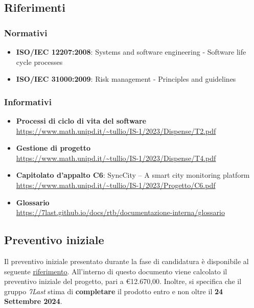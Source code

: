 \subsection{Riferimenti}
    \subsubsection{Normativi} %
        \begin{itemize}
            \item \textbf{ISO/IEC 12207:2008}: Systems and software engineering - Software life cycle processes
            \item \textbf{ISO/IEC 31000:2009}: Risk management - Principles and guidelines
        \end{itemize}
    \subsubsection{Informativi}
        \begin{itemize}
            \item \textbf{Processi di ciclo di vita del software} \\
                \url{https://www.math.unipd.it/~tullio/IS-1/2023/Dispense/T2.pdf}
            \item \textbf{Gestione di progetto} \\ 
                \url{https://www.math.unipd.it/~tullio/IS-1/2023/Dispense/T4.pdf}
            \item \textbf{Capitolato d'appalto C6}: SyncCity – A smart city monitoring platform\\
                \url{https://www.math.unipd.it/~tullio/IS-1/2023/Progetto/C6.pdf}
            \item \textbf{Glossario} \\
                \url{https://7last.github.io/docs/rtb/documentazione-interna/glossario}
            \end{itemize}

\subsection{Preventivo iniziale}
Il preventivo iniziale presentato durante la fase di candidatura è disponibile al seguente \uline{\href{https://github.com/7Last/docs/blob/main/1_candidatura/preventivo_costi_assunzione_impegni_v2.0.pdf}{riferimento}}. All'interno di questo documento viene calcolato il preventivo iniziale del progetto, pari a €12.670,00. Inoltre, si specifica che il gruppo \textit{7Last} stima di \textbf{completare} il prodotto entro e non oltre il \textbf{24 Settembre 2024}.